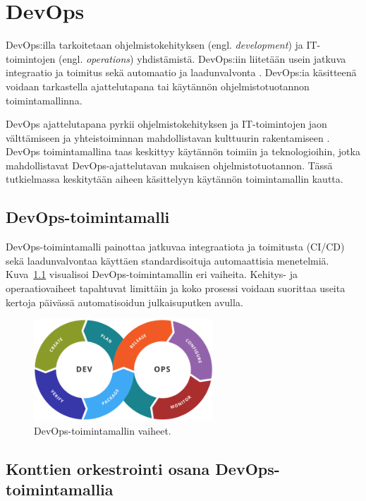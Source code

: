 \chapter{DevOps\label{devops}}

DevOps:illa tarkoitetaan ohjelmistokehityksen (engl. \textit{development}) ja IT-toimintojen (engl. \textit{operations}) yhdistämistä.
DevOps:iin liitetään usein jatkuva integraatio ja toimitus sekä automaatio ja laadunvalvonta \cite{Jabbari16}.
DevOps:ia käsitteenä voidaan tarkastella ajattelutapana tai käytännön ohjelmistotuotannon toimintamallinna.

DevOps ajattelutapana pyrkii ohjelmistokehityksen ja IT-toimintojen jaon välttämiseen ja yhteistoiminnan mahdollistavan kulttuurin rakentamiseen \cite{Klein21}.
DevOps toimintamallina taas keskittyy käytännön toimiin ja teknologioihin, jotka mahdollistavat DevOps-ajattelutavan mukaisen ohjelmistotuotannon.
Tässä tutkielmassa keskitytään aiheen käsittelyyn käytännön toimintamallin kautta.

\section{DevOps-toimintamalli}

DevOps-toimintamalli painottaa jatkuvaa integraatiota ja toimitusta (CI/CD) sekä laadunvalvontaa käyttäen standardisoituja automaattisia menetelmiä. Kuva~\ref{fig:devops} visualisoi DevOps-toimintamallin eri vaiheita. Kehitys- ja operaatiovaiheet tapahtuvat limittäin ja koko prosessi voidaan suorittaa useita kertoja päivässä automatisoidun julkaisuputken avulla. \cite{Jabbari16}

\begin{figure}[ht]
\begin{center}
\includegraphics[width=0.6\textwidth]{figures/devops_toolchain.png}
\caption{DevOps-toimintamallin vaiheet.\cite{Wikimedia23}\label{fig:devops}}
\end{center}
\end{figure}

\section{Konttien orkestrointi osana DevOps-toimintamallia}


